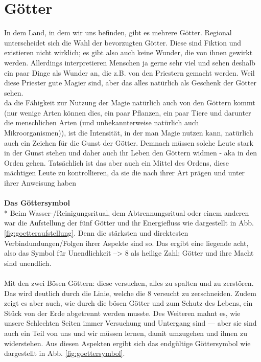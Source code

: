 \section{Götter}
In dem Land, in dem wir uns befinden, gibt es mehrere Götter. Regional unterscheidet sich die Wahl der bevorzugten Götter.
Diese sind Fiktion und existieren nicht wirklich; es gibt also auch keine Wunder, die von ihnen gewirkt werden. Allerdings interpretieren Menschen ja gerne sehr viel und sehen deshalb ein paar Dinge als Wunder an, die z.B. von den Priestern gemacht werden. Weil diese Priester gute Magier sind, aber das alles natürlich als Geschenk der Götter sehen.\\
da die Fähigkeit zur Nutzung der Magie natürlich auch von den Göttern kommt (nur wenige Arten können dies, ein paar Pflanzen, ein paar Tiere und darunter die menschlichen Arten (und unbekannterweise natürlich auch Mikroorganismen)), ist die Intensität, in der man Magie nutzen kann, natürlich auch ein Zeichen für die Gunst der Götter. Demnach müssen solche Leute stark in der Gunst stehen und daher auch ihr Leben den Göttern widmen - aka in den Orden gehen. Tatsächlich ist das aber auch ein Mittel des Ordens, diese mächtigen Leute zu kontrollieren, da sie die nach ihrer Art prägen und unter ihrer Anweisung haben\\\\
\textbf{Das Göttersymbol}\\*
Beim Wasser-/Reinigungsritual, dem Abtrennungsritual oder einem anderen war die Aufstellung der fünf Götter und ihr Energiefluss wie dargestellt in Abb. \ref{fig:goetteraufstellung}. Denn die stärksten und direktesten Verbindundungen/Folgen ihrer Aspekte sind so. Das ergibt eine liegende acht, also das Symbol für Unendlichkeit --> 8 als heilige Zahl; Götter und ihre Macht sind unendlich.\\
\\
Mit den zwei Bösen Göttern: diese versuchen, alles zu spalten und zu zerstören. Das wird deutlich durch die Linie, welche die 8 versucht zu zerschneiden. Zudem zeigt es aber auch, wie durch die bösen Götter und zum Schutz des Lebens, ein Stück von der Erde abgetrennt werden musste. Des Weiteren mahnt es, wie unsere Schlechten Seiten immer Versuchung und Untergang sind — aber sie sind auch ein Teil von uns und wir müssen lernen, damit umzugehen und ihnen zu widerstehen. Aus diesen Aspekten ergibt sich das endgültige Göttersymbol wie dargestellt in Abb. \ref{fig:goettersymbol}.\\

